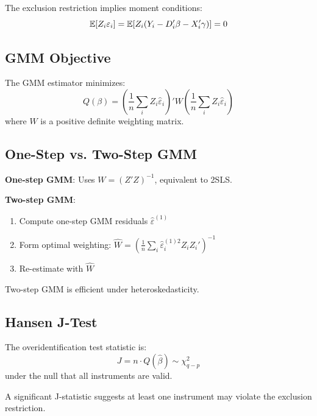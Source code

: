 The exclusion restriction implies moment conditions:
\begin{equation}
\mathbb{E}[Z_i \varepsilon_i] = \mathbb{E}[Z_i(Y_i - D_i'\beta - X_i'\gamma)] = 0
\label{eq:moment_conditions}
\end{equation}

\subsection{GMM Objective}

The GMM estimator minimizes:
\begin{equation}
Q(\beta) = \left(\frac{1}{n}\sum_i Z_i \hat{\varepsilon}_i\right)' W \left(\frac{1}{n}\sum_i Z_i \hat{\varepsilon}_i\right)
\label{eq:gmm_objective}
\end{equation}
where $W$ is a positive definite weighting matrix.

\subsection{One-Step vs. Two-Step GMM}

\textbf{One-step GMM}: Uses $W = (Z'Z)^{-1}$, equivalent to 2SLS.

\textbf{Two-step GMM}:
\begin{enumerate}
    \item Compute one-step GMM residuals $\hat{\varepsilon}^{(1)}$
    \item Form optimal weighting: $\hat{W} = \left(\frac{1}{n}\sum_i \hat{\varepsilon}_i^{(1)2} Z_i Z_i'\right)^{-1}$
    \item Re-estimate with $\hat{W}$
\end{enumerate}

Two-step GMM is efficient under heteroskedasticity.

\subsection{Hansen J-Test}

\begin{definition}
\label{def:hansen_j}
The overidentification test statistic is:
\begin{equation}
J = n \cdot Q(\hat{\beta}) \sim \chi^2_{q-p}
\end{equation}
under the null that all instruments are valid.
\end{definition}

A significant J-statistic suggests at least one instrument may violate the exclusion restriction.


